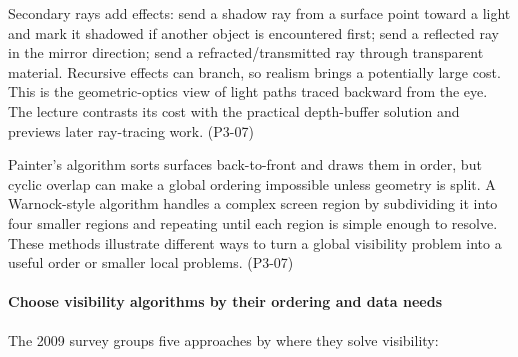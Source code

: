 Secondary rays add effects: send a shadow ray from a surface point toward a light and mark it shadowed if another object is encountered first; send a reflected ray in the mirror direction; send a refracted/transmitted ray through transparent material. Recursive effects can branch, so realism brings a potentially large cost. This is the geometric-optics view of light paths traced backward from the eye. The lecture contrasts its cost with the practical depth-buffer solution and previews later ray-tracing work. (P3-07)

Painter's algorithm sorts surfaces back-to-front and draws them in order, but cyclic overlap can make a global ordering impossible unless geometry is split. A Warnock-style algorithm handles a complex screen region by subdividing it into four smaller regions and repeating until each region is simple enough to resolve. These methods illustrate different ways to turn a global visibility problem into a useful order or smaller local problems. (P3-07)

\paragraph{Choose visibility algorithms by their ordering and data needs}\label{choose-visibility-algorithms-by-their-ordering-and-data-needs}

The 2009 survey groups five approaches by where they solve visibility:


